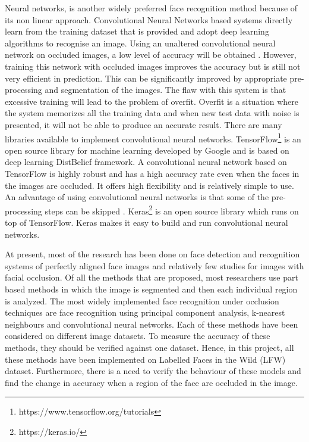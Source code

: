 \documentclass[conference]{IEEEtran}
\begin{document}
Neural networks, is another widely preferred face recognition method because of its non linear approach. Convolutional Neural Networks based systems directly learn from the training dataset that is provided and adopt deep learning algorithms to recognise an image. Using an unaltered convolutional neural network on occluded images, a low level of accuracy will be obtained \cite{chandler2016mitigation}. However, training this network with occluded images improves the accuracy but is still not very efficient in prediction. This can be significantly improved by appropriate pre-processing and segmentation of the images. The flaw with this system is that excessive training will lead to the problem of overfit. Overfit is a situation where the system memorizes all the training data and when new test data with noise is presented, it will not be able to produce an accurate result. There are many libraries available to implement convolutional neural networks\cite{2016arXiv160502688short}\cite{Jia:2014:CCA:2647868.2654889}. TensorFlow\footnote{https://www.tensorflow.org/tutorials} is an open source library for machine learning developed by Google and is based on deep learning DistBelief framework. A convolutional neural network based on TensorFlow is highly robust and has a high accuracy rate even when the faces in the images are occluded.  It offers high flexibility and is relatively simple to use. An advantage of using convolutional neural networks is that some of the pre-processing steps can be skipped \cite{oliveira2017irish}. Keras\footnote{https://keras.io/} is an open source library which runs on top of TensorFlow. Keras makes it easy to build and run convolutional neural networks\cite{chollet2015keras}.

At present, most of the research has been done on face detection and recognition systems of perfectly aligned face images and relatively few studies for images with facial occlusion. Of all the methods that are proposed, most researchers use part based methods in which the image is segmented and then each individual region is analyzed. The most widely implemented face recognition under occlusion techniques are face recognition using principal component analysis, k-nearest neighbours and convolutional neural networks. Each of these methods have been considered on different image datasets. To measure the accuracy of these methods, they should be verified against one dataset. Hence, in this project, all these methods have been implemented on Labelled Faces in the Wild (LFW) dataset. Furthermore, there is a need to verify the behaviour of these models and find the change in accuracy when a region of the face are occluded in the image.
\end{document}
